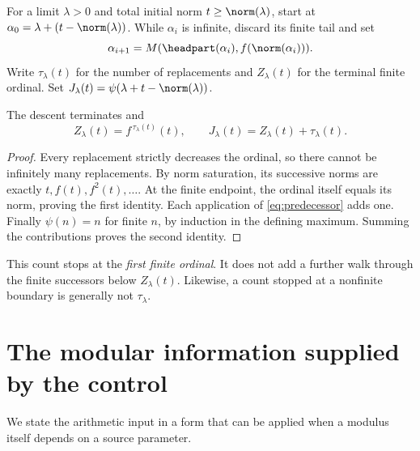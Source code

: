 \documentclass[11pt]{article}
\begin{document}
\begin{definition}
For a limit $\lambda>0$ and total initial norm $t\ge\norm(\lambda)$,
start at $\alpha_0=\lambda+(t-\norm(\lambda))$. While $\alpha_i$ is
infinite, discard its finite tail and set
\[
 \alpha_{i+1}=M(\headpart(\alpha_i),f(\norm(\alpha_i))).
\]
Write $\tau_\lambda(t)$ for the number of replacements and
$Z_\lambda(t)$ for the terminal finite ordinal.
Set $J_\lambda(t)=\psi(\lambda+t-\norm(\lambda))$.
\end{definition}

\begin{proposition}\label{prop:complete}
The descent terminates and
\[
 Z_\lambda(t)=f^{\,\tau_\lambda(t)}(t),\qquad
 J_\lambda(t)=Z_\lambda(t)+\tau_\lambda(t).
\]
\end{proposition}
\begin{proof}
Every replacement strictly decreases the ordinal, so there cannot be
infinitely many replacements. By norm saturation, its successive norms
are exactly $t,f(t),f^2(t),\ldots$. At the finite endpoint, the ordinal
itself equals its norm, proving the first identity. Each application of
\eqref{eq:predecessor} adds one. Finally $\psi(n)=n$ for finite $n$,
by induction in the defining maximum. Summing the contributions proves
the second identity.
\end{proof}

This count stops at the \emph{first finite ordinal}. It does not add a
further walk through the finite successors below $Z_\lambda(t)$.
Likewise, a count stopped at a nonfinite boundary is generally not
$\tau_\lambda$.

\section{The modular information supplied by the control}

We state the arithmetic input in a form that can be applied when a
modulus itself depends on a source parameter.
\end{document}
